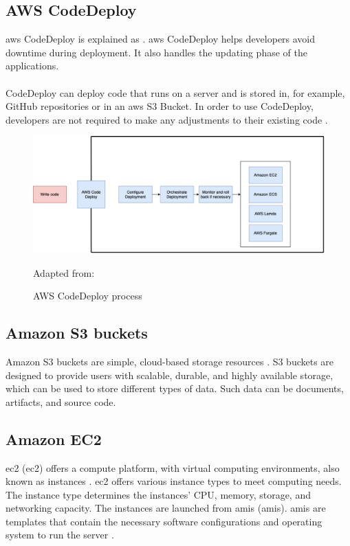 \subsection{AWS CodeDeploy}
\acrshort{aws} CodeDeploy is explained as  \cite{AWSCodeDeploy}.
\acrshort{aws} CodeDeploy helps developers avoid downtime during deployment. It also handles the updating phase of the applications. 
\\~\\
CodeDeploy can deploy code that runs on a server and is stored in, for example, GitHub repositories or in an \acrshort{aws} S3 Bucket. In order to use CodeDeploy, developers are not required to make any adjustments to their existing code \cite{CodeDeploy1}.

\begin{figure}[H]
    \centering
    \includegraphics[scale=0.4]{Images/AWSCodeDeploy.png}
    \caption{AWS CodeDeploy process} Adapted from: \cite{CodeDeploy1}
    \label{fig: AWS CodeDeploy Process}
\end{figure}


\subsection{Amazon S3 buckets}
Amazon S3 buckets are simple, cloud-based storage resources \cite{S3Bucket}. S3 buckets are designed to provide users with scalable, durable, and highly available storage, which can be used to store different types of data. Such data can be documents, \gls{artifact}s, and source code. 

\subsection{Amazon EC2}
\acrlong{ec2} (\acrshort{ec2}) offers a \gls{compute platform}, with virtual computing environments, also known as instances \cite{awsec2}. \acrshort{ec2} offers various instance types to meet computing needs. The instance type determines the instances' CPU, memory, storage, and networking capacity. The instances are launched from \acrlong{amis} (\acrshort{amis}). \acrshort{amis} are templates that contain the necessary software configurations and operating system to run the server \cite{amis}.